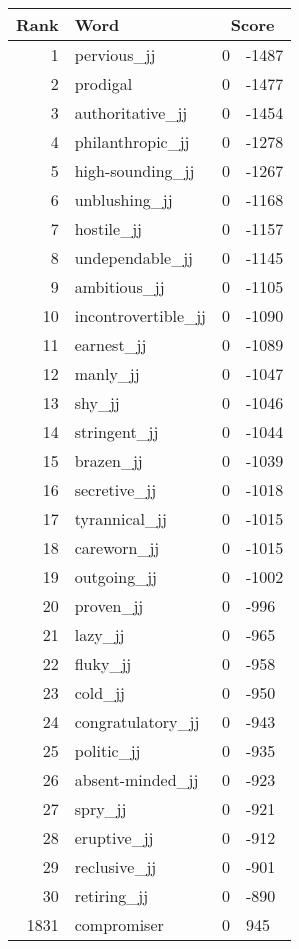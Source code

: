 \begin{longtable}[!htbp]{| rlr@{.}l |}
    \hline
    \textbf{Rank} & \textbf{Word} & \multicolumn{2}{c|}{\textbf{Score}} \\
    \hline
    \endhead
    1 & pervious\_jj & 0 & -1487 \\
    2 & prodigal & 0 & -1477 \\
    3 & authoritative\_jj & 0 & -1454 \\
    4 & philanthropic\_jj & 0 & -1278 \\
    5 & high-sounding\_jj & 0 & -1267 \\
    6 & unblushing\_jj & 0 & -1168 \\
    7 & hostile\_jj & 0 & -1157 \\
    8 & undependable\_jj & 0 & -1145 \\
    9 & ambitious\_jj & 0 & -1105 \\
    10 & incontrovertible\_jj & 0 & -1090 \\
    11 & earnest\_jj & 0 & -1089 \\
    12 & manly\_jj & 0 & -1047 \\
    13 & shy\_jj & 0 & -1046 \\
    14 & stringent\_jj & 0 & -1044 \\
    15 & brazen\_jj & 0 & -1039 \\
    16 & secretive\_jj & 0 & -1018 \\
    17 & tyrannical\_jj & 0 & -1015 \\
    18 & careworn\_jj & 0 & -1015 \\
    19 & outgoing\_jj & 0 & -1002 \\
    20 & proven\_jj & 0 & -996 \\
    21 & lazy\_jj & 0 & -965 \\
    22 & fluky\_jj & 0 & -958 \\
    23 & cold\_jj & 0 & -950 \\
    24 & congratulatory\_jj & 0 & -943 \\
    25 & politic\_jj & 0 & -935 \\
    26 & absent-minded\_jj & 0 & -923 \\
    27 & spry\_jj & 0 & -921 \\
    28 & eruptive\_jj & 0 & -912 \\
    29 & reclusive\_jj & 0 & -901 \\
    30 & retiring\_jj & 0 & -890 \\
    1831 & compromiser & 0 & 945 \\

\end{longtable}
